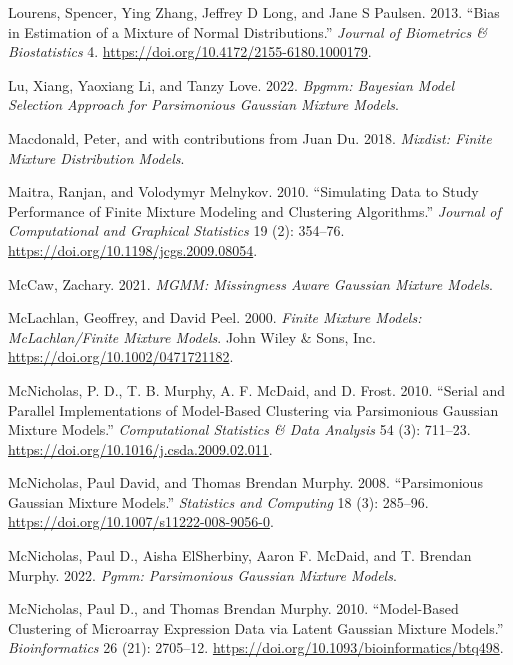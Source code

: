 \begin{CSLReferences}{1}{0}
\leavevmode{}%
Lourens, Spencer, Ying Zhang, Jeffrey D Long, and Jane S Paulsen. 2013. {``Bias in {Estimation} of a {Mixture} of {Normal Distributions}.''} \emph{Journal of Biometrics \& Biostatistics} 4. \url{https://doi.org/10.4172/2155-6180.1000179}.

\leavevmode{}%
Lu, Xiang, Yaoxiang Li, and Tanzy Love. 2022. \emph{Bpgmm: Bayesian Model Selection Approach for Parsimonious Gaussian Mixture Models}.

\leavevmode{}%
Macdonald, Peter, and with contributions from Juan Du. 2018. \emph{Mixdist: Finite Mixture Distribution Models}.

\leavevmode{}%
Maitra, Ranjan, and Volodymyr Melnykov. 2010. {``Simulating {Data} to {Study Performance} of {Finite Mixture Modeling} and {Clustering Algorithms}.''} \emph{Journal of Computational and Graphical Statistics} 19 (2): 354--76. \url{https://doi.org/10.1198/jcgs.2009.08054}.

\leavevmode{}%
McCaw, Zachary. 2021. \emph{MGMM: Missingness Aware Gaussian Mixture Models}.

\leavevmode{}%
McLachlan, Geoffrey, and David Peel. 2000. \emph{Finite {Mixture Models}: {McLachlan}/{Finite Mixture Models}}. {John Wiley \& Sons, Inc.} \url{https://doi.org/10.1002/0471721182}.

\leavevmode{}%
McNicholas, P. D., T. B. Murphy, A. F. McDaid, and D. Frost. 2010. {``Serial and Parallel Implementations of Model-Based Clustering via Parsimonious Gaussian Mixture Models.''} \emph{Computational Statistics \& Data Analysis} 54 (3): 711--23. \url{https://doi.org/10.1016/j.csda.2009.02.011}.

\leavevmode{}%
McNicholas, Paul David, and Thomas Brendan Murphy. 2008. {``Parsimonious Gaussian Mixture Models.''} \emph{Statistics and Computing} 18 (3): 285--96. \url{https://doi.org/10.1007/s11222-008-9056-0}.

\leavevmode{}%
McNicholas, Paul D., Aisha ElSherbiny, Aaron F. McDaid, and T. Brendan Murphy. 2022. \emph{Pgmm: Parsimonious Gaussian Mixture Models}.

\leavevmode{}%
McNicholas, Paul D., and Thomas Brendan Murphy. 2010. {``Model-Based Clustering of Microarray Expression Data via Latent Gaussian Mixture Models.''} \emph{Bioinformatics} 26 (21): 2705--12. \url{https://doi.org/10.1093/bioinformatics/btq498}.


\end{CSLReferences}
